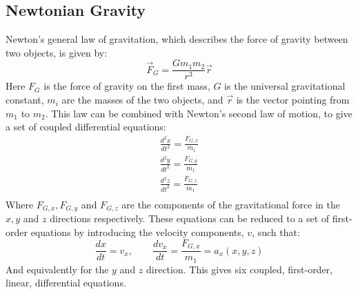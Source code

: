 \documentclass[a4paper, 10pt]{article}
\begin{document}
\subsection{Newtonian Gravity}\label{Newtonian_Gravity}
Newton's general law of gravitation, which describes the force of gravity between two objects, is given by:
\begin{equation}
\vec{F}_{G}=\frac{Gm_1m_2}{r^3}\vec{r}
\end{equation}
Here $F_G$ is the force of gravity on the first mass, $G$ is the universal gravitational constant, $m_i$ are the masses of the two objects, and $\vec{r}$ is the vector pointing from $m_1$ to $m_2$. This law can be combined with Newton's second law of motion, to give a set of coupled differential equations:
\begin{equation}\label{eq:coupled_diff}
\begin{split}
\frac{d^2x}{dt^2}=\frac{F_{G,x}}{m_1}\\
\frac{d^2 y}{dt^2}=\frac{F_{G,y}}{m_1}\\
\frac{d^2 z}{dt^2}=\frac{F_{G,z}}{m_1}\\
\end{split}
\end{equation}
Where $F_{G,x}, F_{G,y}$ and $F_{G,z}$ are the components of the gravitational force in the $x, y$ and $z$ directions respectively. These equations can be reduced to a set of first-order equations by introducing the velocity components, $v$, such that:
\begin{equation}\label{eq:Velocity_position_equation}
\frac{dx}{dt}=v_x, \quad \quad \frac{dv_x}{dt}=\frac{F_{G,x}}{m_1}=a_x(x,y,z)
\end{equation}
And equivalently for the $y$ and $z$ direction. This gives six coupled, first-order, linear, differential equations.
\end{document}
